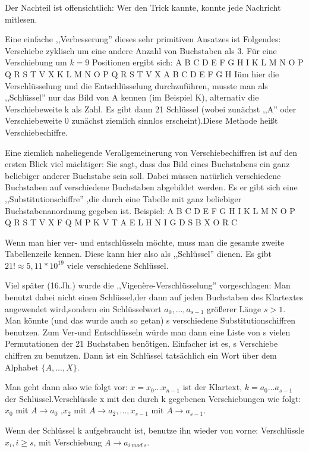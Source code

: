 \documentclass[a4paper]{article}
\begin{document}
\begin{multicols}{3}
Der Nachteil ist offensichtlich: Wer den Trick kannte, konnte jede Nachricht mitlesen.

Eine einfache ,,Verbesserung'' dieses sehr primitiven Ansatzes ist Folgendes: Verschiebe zyklisch um eine andere Anzahl von Buchstaben als 3. Für eine Verschiebung um $k=9$ Positionen ergibt sich:
    A B C D E F G H I K L M N O P Q R S T V X
    K L M N O P Q R S T V X A B C D E F G H Iüm hier die Verschlüsselung und die Entschlüsselung durchzuführen, musste man als ,,Schlüssel''  nur das Bild von A kennen (im Beispiel K), alternativ die Verschiebeweite k
als Zahl. Es gibt dann 21 Schlüssel (wobei zunächst ,,A'' oder Verschiebeweite 0 zunächst ziemlich sinnlos erscheint).Diese Methode heißt Verschiebechiffre.

Eine ziemlich naheliegende Verallgemeinerung von Verschiebechiffren ist auf den ersten Blick viel mächtiger: Sie sagt, dass das Bild eines Buchstabens ein ganz beliebiger anderer Buchstabe sein soll. Dabei müssen natürlich verschiedene Buchstaben auf verschiedene Buchstaben abgebildet werden. Es er gibt sich eine ,,Substitutionschiffre'' ,die durch eine Tabelle mit ganz beliebiger Buchstabenanordnung gegeben ist. Beispiel:
    A B C D E F G H I K L M N O P Q R S T V X
    F Q M P K V T A E L H N I G D S B X O R C

Wenn man hier ver- und entschlüsseln möchte, muss man die gesamte zweite Tabellenzeile kennen. Diese kann hier also als ,,Schlüssel''  dienen. Es gibt $21!\approx 5,11* 10^{19}$ viele verschiedene Schlüssel.

Viel später (16.Jh.) wurde die ,,Vigenère-Verschlüsselung'' vorgeschlagen: Man benutzt dabei nicht einen Schlüssel,der dann auf jeden Buchstaben des Klartextes angewendet wird,sondern ein Schlüsselwort $a_0,...,a_{s-1}$ größerer Länge $s > 1$. Man könnte (und das wurde auch so getan) s verschiedene Substitutionschiffren benutzen. Zum Ver-und Entschlüsseln
würde man dann eine Liste von s vielen Permutationen der 21 Buchstaben benötigen. Einfacher ist es, s Verschiebe chiffren zu benutzen. Dann ist ein Schlüssel tatsächlich ein Wort über dem Alphabet $\{A,...,X\}$.

Man geht dann also wie folgt vor: $x=x_0...x_{n-1}$ ist der Klartext, $k=a_0 ...a_{s-1}$ der Schlüssel.Verschlüssle x mit den durch k gegebenen Verschiebungen wie folgt:
$x_0$ mit $A \rightarrow a_0$ ,$x_2$ mit $A \rightarrow a_2,... ,x_{s-1}$ mit $A\rightarrow a_{s-1}$.

Wenn der Schlüssel k aufgebraucht ist, benutze ihn wieder von vorne: Verschlüssle $x_i,i\geq s$, mit Verschiebung $A \rightarrow a_{i\ mod\ s}$.


\end{multicols}
\end{document}
